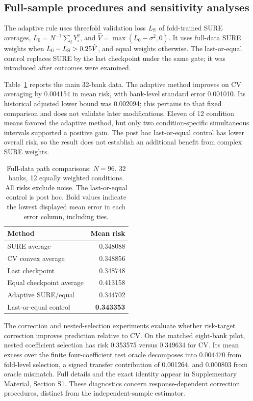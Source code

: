 \documentclass[pdflatex,sn-mathphys-ay]{sn-jnl}
\theoremstyle{remark}\newtheorem{remark}[theorem]{Remark}
\begin{document}
\subsection{Full-sample procedures and sensitivity analyses}
The adaptive rule uses threefold validation loss $L_{\rm S}$ of fold-trained SURE averages, $L_0=N^{-1}\sum_iY_i^2$, and $\hat V=\max(L_0-\sigma^2,0)$. It uses full-data SURE weights when $L_0-L_{\rm S}>0.25\hat V$, and equal weights otherwise. The last-or-equal control replaces SURE by the last checkpoint under the same gate; it was introduced after outcomes were examined.


Table~\ref{tab:main} reports the main 32-bank data. The adaptive method improves on CV averaging by 0.004154 in mean risk, with bank-level standard error 0.001010. Its historical adjusted lower bound was 0.002094; this pertains to that fixed comparison and does not validate later modifications. Eleven of 12 condition means favored the adaptive method, but only two condition-specific simultaneous intervals supported a positive gain. The post hoc last-or-equal control has lower overall risk, so the result does not establish an additional benefit from complex SURE weights.

\begin{table}[t]\centering\small
\caption{Full-data path comparisons: $N=96$, 32 banks, 12 equally weighted conditions. All risks exclude noise. The last-or-equal control is post hoc. Bold values indicate the lowest displayed mean error in each error column, including ties.}\label{tab:main}
\begin{tabular}{lr}\toprule Method & Mean risk\\\midrule
SURE average & 0.348088\\
CV convex average & 0.348856\\
Last checkpoint & 0.348748\\
Equal checkpoint average & 0.413158\\
Adaptive SURE/equal & 0.344702\\
Last-or-equal control & \textbf{0.343353}\\\bottomrule
\end{tabular}\end{table}

The correction and nested-selection experiments evaluate whether risk-target correction improves prediction relative to CV. On the matched eight-bank pilot, nested coefficient selection has risk 0.353575 versus 0.349634 for CV. Its mean excess over the finite four-coefficient test oracle decomposes into 0.004470 from fold-level selection, a signed transfer contribution of 0.001264, and 0.000803 from oracle mismatch. Full details and the exact identity appear in Supplementary Material, Section S1. These diagnostics concern response-dependent correction procedures, distinct from the independent-sample estimator.
\end{document}

